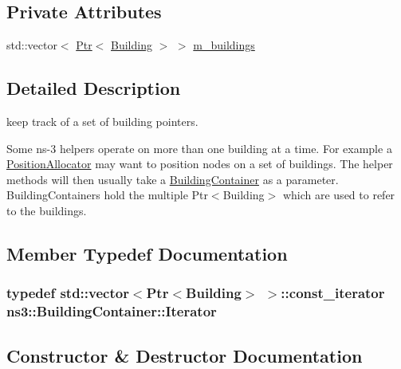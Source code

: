\subsection*{Private Attributes}
\begin{DoxyCompactItemize}
\item 
std\+::vector$<$ \hyperlink{classns3_1_1Ptr}{Ptr}$<$ \hyperlink{classns3_1_1Building}{Building} $>$ $>$ \hyperlink{classns3_1_1BuildingContainer_a1cf9c298d873d888db65a51c843d3dbc}{m\+\_\+buildings}
\end{DoxyCompactItemize}


\subsection{Detailed Description}
keep track of a set of building pointers. 

Some ns-\/3 helpers operate on more than one building at a time. For example a \hyperlink{classns3_1_1PositionAllocator}{Position\+Allocator} may want to position nodes on a set of buildings. The helper methods will then usually take a \hyperlink{classns3_1_1BuildingContainer}{Building\+Container} as a parameter. Building\+Containers hold the multiple Ptr$<$\+Building$>$ which are used to refer to the buildings. 

\subsection{Member Typedef Documentation}
\subsubsection[{\texorpdfstring{Iterator}{Iterator}}]{\setlength{\rightskip}{0pt plus 5cm}typedef std\+::vector$<${\bf Ptr}$<${\bf Building}$>$ $>$\+::const\+\_\+iterator {\bf ns3\+::\+Building\+Container\+::\+Iterator}}\hypertarget{classns3_1_1BuildingContainer_afe903c6901e047ee0fa356018a0ac445}{}\label{classns3_1_1BuildingContainer_afe903c6901e047ee0fa356018a0ac445}


\subsection{Constructor \& Destructor Documentation}
